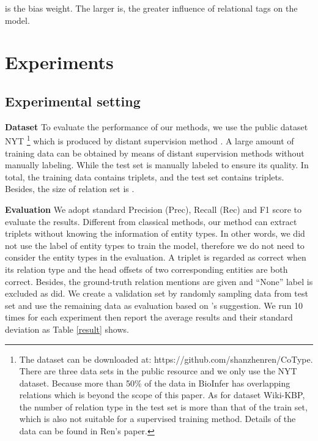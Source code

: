 \documentclass[11pt,a4paper]{article}
\begin{document}
 is the bias weight. The larger  is, the greater influence of relational tags on the model.

\section{Experiments}
\subsection{Experimental setting}
\textbf{Dataset}
To evaluate the performance of our methods, we use the public dataset NYT
\footnote{The dataset can be downloaded at: https://github.com/shanzhenren/CoType.
There are three data sets in the public resource and we only use the NYT dataset.
Because more than 50\% of the data in BioInfer has overlapping relations which is beyond the scope of this paper.
As for dataset Wiki-KBP, the number of relation type in the test set is more than that of the train set, which is also not suitable for a supervised training method.
Details of the data can be found in Ren's\cite{ren2016cotype} paper.
}
which is produced by distant supervision method \cite{ren2016cotype}.
A large amount of training data can be obtained by means of distant supervision methods without manually labeling.
While the test set is manually labeled to ensure its quality.
In total, the training data contains  triplets,
and the test set contains  triplets.
Besides, the size of relation set is .


\noindent\textbf{Evaluation}
We adopt standard Precision (Prec), Recall (Rec) and F1 score to evaluate the results.
Different from classical methods,
our method can extract triplets without knowing the information of entity types.
In other words, we did not use the label of entity types to train the model,
therefore we do not need to consider the entity types in the evaluation.
A triplet is regarded as correct when its relation type and the head offsets of two corresponding entities are both correct.
Besides, the ground-truth relation mentions are given and ``None'' label is excluded as \cite{ren2016cotype,li2014,miwa2016end} did.
We create a validation set by randomly sampling  data from test set and use the remaining data as evaluation based on  \cite{ren2016cotype}'s suggestion. We run 10 times for each experiment then report the average results and their
standard deviation
as Table \ref{result} shows.
\end{document}
